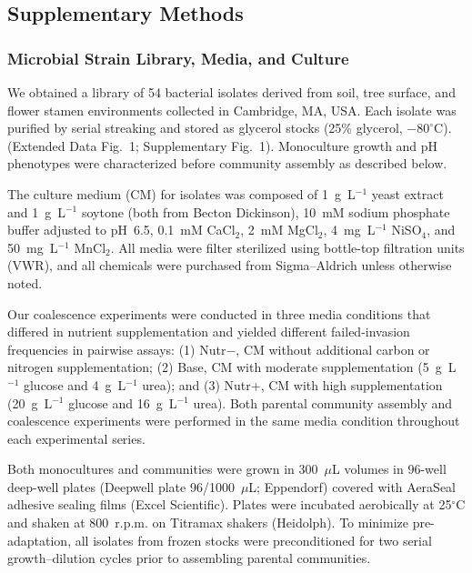 \subsection*{Supplementary Methods}
\label{sec:suppl:methods}

\subsubsection*{Microbial Strain Library, Media, and Culture}
\label{sec:suppl:strains}

We obtained a library of 54 bacterial isolates derived from soil, tree surface, and flower stamen environments collected in Cambridge, MA, USA. Each isolate was purified by serial streaking and stored as glycerol stocks (25\% glycerol, $-80^\circ$C).  (Extended Data Fig.~1; Supplementary Fig.~1). Monoculture growth and pH phenotypes were characterized before community assembly as described below.

The culture medium (CM) for isolates was composed of 1~g~L$^{-1}$ yeast extract and 1~g~L$^{-1}$ soytone (both from Becton Dickinson), 10~mM sodium phosphate buffer adjusted to pH~6.5, 0.1~mM CaCl$_2$, 2~mM MgCl$_2$, 4~mg~L$^{-1}$ NiSO$_4$, and 50~mg~L$^{-1}$ MnCl$_2$. All media were filter sterilized using bottle-top filtration units (VWR), and all chemicals were purchased from Sigma--Aldrich unless otherwise noted.

Our coalescence experiments were conducted in three media conditions that differed in nutrient supplementation and yielded different failed-invasion frequencies in pairwise assays: (1) Nutr$-$, CM without additional carbon or nitrogen supplementation; (2) Base, CM with moderate supplementation (5~g~L$^{-1}$ glucose and 4~g~L$^{-1}$ urea); and (3) Nutr$+$, CM with high supplementation (20~g~L$^{-1}$ glucose and 16~g~L$^{-1}$ urea). Both parental community assembly and coalescence experiments were performed in the same media condition throughout each experimental series.

Both monocultures and communities were grown in 300~$\mu$L volumes in 96-well deep-well plates (Deepwell plate 96/1000~$\mu$L; Eppendorf) covered with AeraSeal adhesive sealing films (Excel Scientific). Plates were incubated aerobically at 25$^\circ$C and shaken at 800~r.p.m. on Titramax shakers (Heidolph). To minimize pre-adaptation, all isolates from frozen stocks were preconditioned for two serial growth--dilution cycles prior to assembling parental communities.


